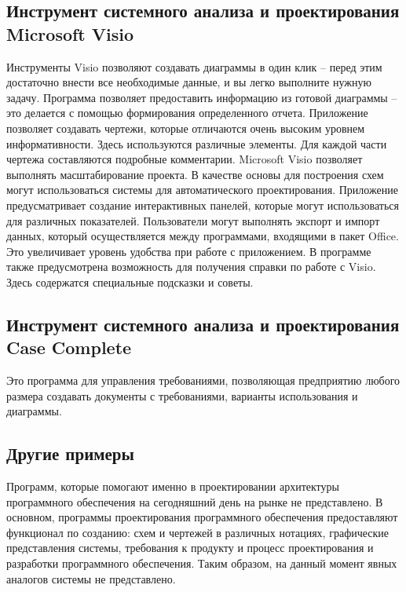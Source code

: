 \subsection{Инструмент системного анализа и проектирования Microsoft Visio}\label{sec:ch1/sec6/sub5}
Инструменты Visio позволяют создавать диаграммы в один клик – перед этим достаточно внести все необходимые данные, и вы легко выполните нужную задачу. Программа позволяет предоставить информацию из готовой диаграммы – это делается с помощью формирования определенного отчета.
Приложение позволяет создавать чертежи, которые отличаются очень высоким уровнем информативности. Здесь используются различные элементы. Для каждой части чертежа составляются подробные комментарии.
Microsoft Visio позволяет выполнять масштабирование проекта. В качестве основы для построения схем могут использоваться системы для автоматического проектирования. Приложение предусматривает создание интерактивных панелей, которые могут использоваться для различных показателей.
Пользователи могут выполнять экспорт и импорт данных, который осуществляется между программами, входящими в пакет Office. Это увеличивает уровень удобства при работе с приложением. В программе также предусмотрена возможность для получения справки по работе с Visio. Здесь содержатся специальные подсказки и советы.

\subsection{Инструмент системного анализа и проектирования Case Complete}\label{sec:ch1/sec6/sub8}
Это программа для управления требованиями, позволяющая предприятию любого размера создавать документы с требованиями, варианты использования и диаграммы.
\subsection{Другие примеры}
Программ, которые помогают именно в проектировании архитектуры программного обеспечения на сегодняшний день на рынке не представлено. В основном, программы проектирования программного обеспечения предоставляют функционал по созданию: схем и чертежей в различных нотациях, графические представления системы, требования к продукту и процесс проектирования и разработки программного обеспечения. Таким образом, на данный момент явных аналогов системы не представлено.
